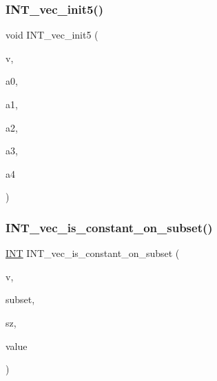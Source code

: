 \subsubsection{\texorpdfstring{I\+N\+T\+\_\+vec\+\_\+init5()}{INT\_vec\_init5()}}
{\footnotesize\ttfamily void I\+N\+T\+\_\+vec\+\_\+init5 (\begin{DoxyParamCaption}\item[{\mbox{\hyperlink{galois_8h_a09fddde158a3a20bd2dcadb609de11dc}{I\+NT}} $\ast$}]{v,  }\item[{\mbox{\hyperlink{galois_8h_a09fddde158a3a20bd2dcadb609de11dc}{I\+NT}}}]{a0,  }\item[{\mbox{\hyperlink{galois_8h_a09fddde158a3a20bd2dcadb609de11dc}{I\+NT}}}]{a1,  }\item[{\mbox{\hyperlink{galois_8h_a09fddde158a3a20bd2dcadb609de11dc}{I\+NT}}}]{a2,  }\item[{\mbox{\hyperlink{galois_8h_a09fddde158a3a20bd2dcadb609de11dc}{I\+NT}}}]{a3,  }\item[{\mbox{\hyperlink{galois_8h_a09fddde158a3a20bd2dcadb609de11dc}{I\+NT}}}]{a4 }\end{DoxyParamCaption})}

\mbox{\label{util_8_c_a7536bf61db31b017af715b1dc756feb7}} 
\subsubsection{\texorpdfstring{I\+N\+T\+\_\+vec\+\_\+is\+\_\+constant\+\_\+on\+\_\+subset()}{INT\_vec\_is\_constant\_on\_subset()}}
{\footnotesize\ttfamily \mbox{\hyperlink{galois_8h_a09fddde158a3a20bd2dcadb609de11dc}{I\+NT}} I\+N\+T\+\_\+vec\+\_\+is\+\_\+constant\+\_\+on\+\_\+subset (\begin{DoxyParamCaption}\item[{\mbox{\hyperlink{galois_8h_a09fddde158a3a20bd2dcadb609de11dc}{I\+NT}} $\ast$}]{v,  }\item[{\mbox{\hyperlink{galois_8h_a09fddde158a3a20bd2dcadb609de11dc}{I\+NT}} $\ast$}]{subset,  }\item[{\mbox{\hyperlink{galois_8h_a09fddde158a3a20bd2dcadb609de11dc}{I\+NT}}}]{sz,  }\item[{\mbox{\hyperlink{galois_8h_a09fddde158a3a20bd2dcadb609de11dc}{I\+NT}} \&}]{value }\end{DoxyParamCaption})}

